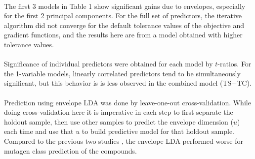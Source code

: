 \documentclass[8pt]{llncs}
\begin{document}
\begin{multicols}{2}
\paragraph{}The first 3 models in Table 1 show significant gains due to envelopes, especially for the first 2 principal components. For the full set of predictors, the iterative algorithm did not converge for the default tolerance values of the objective and gradient functions, and the results here are from a model obtained with higher tolerance values.

\paragraph{}Significance of individual predictors were obtained for each model by $t$-ratios. For the 1-variable models, linearly correlated predictors tend to be simultaneously significant, but this behavior is is less observed in the combined model (TS+TC).

\paragraph{}Prediction using envelope LDA was done by leave-one-out cross-validation. While doing cross-validation here it is imperative in each step to first separate the holdout sample, then use other samples to predict the envelope dimension ($u$) each time and use that $u$ to build predictive model for that holdout sample. Compared to the previous two studies \cite{hawk}\cite{majum}, the envelope LDA performed worse for mutagen class prediction of the compounds.


\end{multicols}
\end{document}
